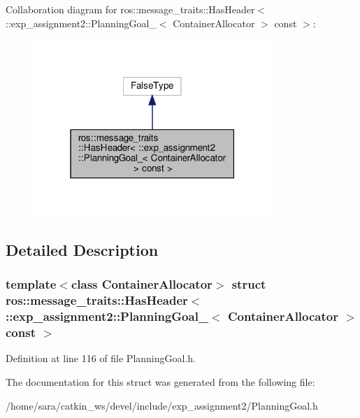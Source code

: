 Collaboration diagram for ros\+:\+:message\+\_\+traits\+:\+:Has\+Header$<$ \+:\+:exp\+\_\+assignment2\+:\+:Planning\+Goal\+\_\+$<$ Container\+Allocator $>$ const $>$\+:
\nopagebreak
\begin{figure}[H]
\begin{center}
\leavevmode
\includegraphics[width=255pt]{structros_1_1message__traits_1_1HasHeader_3_01_1_1exp__assignment2_1_1PlanningGoal___3_01Containde2fb3c754f515403bdd97bb2f24aed1}
\end{center}
\end{figure}


\subsection{Detailed Description}
\subsubsection*{template$<$class Container\+Allocator$>$\newline
struct ros\+::message\+\_\+traits\+::\+Has\+Header$<$ \+::exp\+\_\+assignment2\+::\+Planning\+Goal\+\_\+$<$ Container\+Allocator $>$ const $>$}



Definition at line 116 of file Planning\+Goal.\+h.



The documentation for this struct was generated from the following file\+:\begin{DoxyCompactItemize}
\item 
/home/sara/catkin\+\_\+ws/devel/include/exp\+\_\+assignment2/Planning\+Goal.\+h\end{DoxyCompactItemize}
